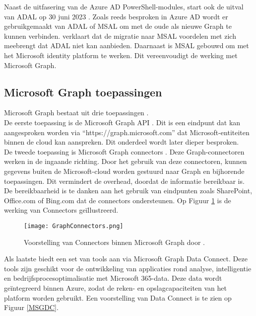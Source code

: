 
Naast de uitfasering van de Azure \ac{AD} PowerShell-modules, start ook de uitval van \ac{ADAL} op 30 juni 2023 \autocite{Sahay2022}. Zoals reeds besproken in Azure \ac{AD} wordt er gebruikgemaakt van \ac{ADAL} of \ac{MSAL} om met de oude als nieuwe Graph te kunnen verbinden. \textcite{Microsoft2023m} verklaart dat de migratie naar \ac{MSAL} voordelen met zich meebrengt dat \ac{ADAL} niet kan aanbieden. Daarnaast is \ac{MSAL} gebouwd om met het Microsoft identity platform te werken. Dit vereenvoudigt de werking met Microsoft Graph.

\subsection{Microsoft Graph toepassingen}


Microsoft Graph bestaat uit drie toepassingen \autocite{Microsoft2023d}. \\

De eerste toepassing is de Microsoft Graph \Ac{API} \autocite{Microsoft2022e}. Dit is een eindpunt dat kan aangesproken worden via “https://graph.microsoft.com” dat Microsoft-entiteiten binnen de cloud kan aanspreken. Dit onderdeel wordt later dieper besproken. \\

De tweede toepassing is Microsoft Graph connectors \autocite{Microsoft2022f}. Deze Graph-connectoren werken in de ingaande richting. Door het gebruik van deze connectoren, kunnen gegevens buiten de Microsoft-cloud worden gestuurd naar Graph en bijhorende toepassingen. Dit vermindert de overhead, doordat de informatie bereikbaar is. De bereikbaarheid is te danken aan het gebruik van eindpunten zoals SharePoint, Office.com of Bing.com dat de connectors ondersteunen. Op Figuur \ref{MSGC} is de werking van Connectors geïllustreerd. \\

\begin{figure}[!h]
    \texttt{[image: GraphConnectors.png]}
    \caption[Voorbeeld Microsoft Graph Connectors]{Voorstelling van Connectors binnen Microsoft Graph door \textcite{Hay2021}.}
    \label{MSGC}
\end{figure}

Als laatste biedt \textcite{Microsoft2022c} een set van tools aan via Microsoft Graph Data Connect. Deze tools zijn geschikt voor de ontwikkeling van applicaties rond analyse, intelligentie en bedrijfsprocesoptimalisatie met Microsoft 365-data. Deze data wordt geïntegreerd binnen Azure, zodat de reken- en opslagcapaciteiten van het platform worden gebruikt. Een voorstelling van Data Connect is te zien op Figuur \ref{MSGDC}. 

